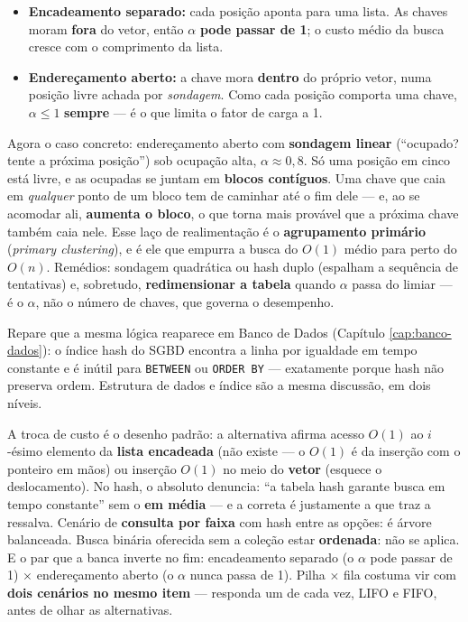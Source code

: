 \begin{itemize}
\item \textbf{Encadeamento separado:} cada posição aponta para uma lista. As
chaves moram \textbf{fora} do vetor, então $\alpha$ \textbf{pode passar de 1};
o custo médio da busca cresce com o comprimento da lista.
\item \textbf{Endereçamento aberto:} a chave mora \textbf{dentro} do próprio
vetor, numa posição livre achada por \emph{sondagem}. Como cada posição
comporta uma chave, $\alpha \le 1$ \textbf{sempre} --- é o que limita o fator
de carga a 1.
\end{itemize}

Agora o caso concreto: endereçamento aberto com \textbf{sondagem linear}
(``ocupado? tente a próxima posição'') sob ocupação alta, $\alpha \approx
0{,}8$. Só uma posição em cinco está livre, e as ocupadas se juntam em
\textbf{blocos contíguos}. Uma chave que caia em \emph{qualquer} ponto de um
bloco tem de caminhar até o fim dele --- e, ao se acomodar ali, \textbf{aumenta
o bloco}, o que torna mais provável que a próxima chave também caia nele. Esse
laço de realimentação é o \textbf{agrupamento primário}
(\emph{primary clustering}), e é ele que empurra a busca do $O(1)$ médio para
perto do $O(n)$. Remédios: sondagem quadrática ou hash duplo (espalham a
sequência de tentativas) e, sobretudo, \textbf{redimensionar a tabela} quando
$\alpha$ passa do limiar --- é o $\alpha$, não o número de chaves, que governa
o desempenho.

Repare que a mesma lógica reaparece em Banco de Dados (Capítulo
\ref{cap:banco-dados}): o índice hash do SGBD encontra a linha por igualdade em
tempo constante e é inútil para \texttt{BETWEEN} ou \texttt{ORDER BY} ---
exatamente porque hash não preserva ordem. Estrutura de dados e índice são a
mesma discussão, em dois níveis.

\begin{pegadinha}
A troca de custo é o desenho padrão: a alternativa afirma acesso $O(1)$ ao
$i$-ésimo elemento da \textbf{lista encadeada} (não existe --- o $O(1)$ é da
inserção com o ponteiro em mãos) ou inserção $O(1)$ no meio do \textbf{vetor}
(esquece o deslocamento). No hash, o absoluto denuncia: ``a tabela hash garante
busca em tempo constante'' sem o \textbf{em média} --- e a correta é justamente
a que traz a ressalva. Cenário de \textbf{consulta por faixa} com hash entre as
opções: é árvore balanceada. Busca binária oferecida sem a coleção estar
\textbf{ordenada}: não se aplica. E o par que a banca inverte no fim:
encadeamento separado (o $\alpha$ pode passar de 1) $\times$ endereçamento
aberto (o $\alpha$ nunca passa de 1). Pilha $\times$ fila costuma vir com
\textbf{dois cenários no mesmo item} --- responda um de cada vez, LIFO e FIFO,
antes de olhar as alternativas.
\end{pegadinha}

